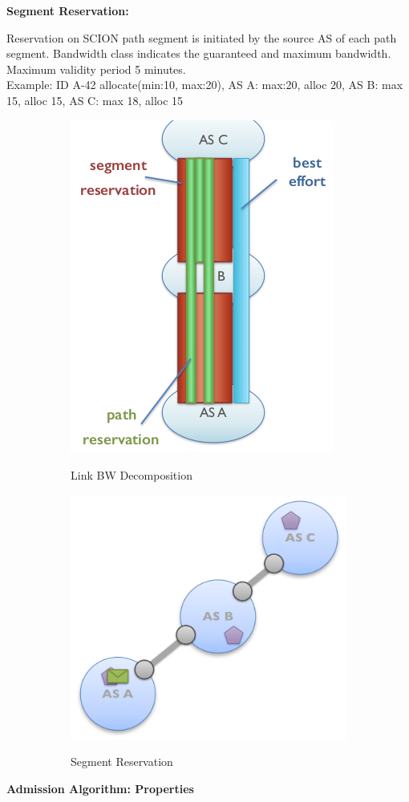 \documentclass[11pt,oneside,a4paper]{article}
\begin{document}
\noindent \textbf{Segment Reservation:}

\noindent Reservation on SCION path segment is initiated by the source AS of each path segment. Bandwidth class indicates the guaranteed and maximum bandwidth. Maximum validity period 5 minutes.\\
Example: ID A-42 allocate(min:10, max:20), AS A: max:20, alloc 20, AS B: max 15, alloc 15, AS C: max 18, alloc 15

\begin{figure}[hb]
	\centering
	\begin{subfigure}[t]{.5\textwidth}
		\centering
		\includegraphics[width=0.4\linewidth]{figures/colibri_linkbw_decomp}
		\label{fig:colibri_linkbw_decomp}
		\caption{Link BW Decomposition}
	\end{subfigure}%
	\begin{subfigure}[t]{.5\textwidth}
		\centering
		\includegraphics[width=0.6\linewidth]{figures/colibri_segment_reservation}
		\label{fig:colibri_segment_reservation}
		\caption{Segment Reservation}
	\end{subfigure}
	\caption{}
\end{figure}

\noindent \textbf{Admission Algorithm: Properties}
\end{document}
